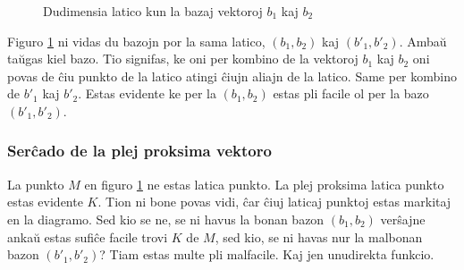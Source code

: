 \documentclass[utf8]{scrartcl}
\begin{document}
\begin{figure}
  \caption{Dudimensia latico kun la bazaj vektoroj $b_1$ kaj $b_2$}
  \label{fig:latico}
\end{figure}

Figuro \ref{fig:latico} ni vidas du bazojn por la sama latico, $(b_1, b_2)$ kaj
$(b'_1, b'_2)$. Ambaŭ taŭgas kiel bazo. Tio signifas, ke oni per kombino de la
vektoroj $b_1$ kaj $b_2$ oni povas de ĉiu punkto de la latico atingi ĉiujn
aliajn de la latico. Same per kombino de $b'_1$ kaj $b'_2$. Estas evidente ke
per la $(b_1, b_2)$ estas pli facile ol per la bazo $(b'_1, b'_2)$.

\subsubsection{Serĉado de la plej proksima vektoro}

La punkto $M$ en figuro \ref{fig:latico} ne estas latica punkto. La plej
proksima latica punkto estas evidente $K$. Tion ni bone povas vidi, ĉar ĉiuj
laticaj punktoj estas markitaj en la diagramo. Sed kio se ne, se ni havus la
bonan bazon $(b_1, b_2)$ verŝajne ankaŭ estas sufiĉe facile trovi $K$ de $M$,
sed kio, se ni havas nur la malbonan bazon $(b'_1, b'_2)$? Tiam estas multe pli
malfacile. Kaj jen unudirekta funkcio.
\end{document}
